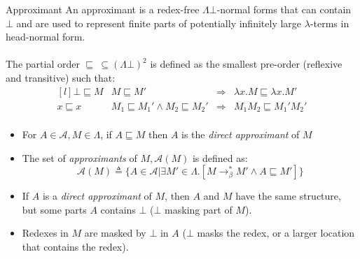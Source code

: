 \begin{definitionbox}{Approximant}
    An approximant is a redex-free $\Lambda\bot$-normal forms that can contain $\bot$ and are used to represent finite parts of potentially infinitely large $\lambda$-terms in head-normal form.
    \\
    \\ The partial order $\sqsubseteq \ \subseteq (\Lambda\bot)^2$ is defined as the smallest pre-order (reflexive and transitive) such that:
    \[\begin{matrix*}[l]
        \bot \sqsubseteq M & M \sqsubseteq M' & \Rightarrow & \lambda x. M \sqsubseteq \lambda x. M' \\
        x \sqsubseteq x & M_1 \sqsubseteq M_1' \land M_2 \sqsubseteq M_2' & \Rightarrow & M_1 M_2 \sqsubseteq M_1' M_2' \\
    \end{matrix*}\]
    \begin{itemize}
        \item For $A \in \mathcal{A}, M \in \Lambda$, if $A \sqsubseteq M$ then $A$ is the \textit{direct approximant} of $M$
        \item {The set of \textit{approximants} of $M, \mathcal{A}(M)$ is defined as:
            \[\mathcal{A}(M) \triangleq \{A \in \mathcal{A} | \exists M' \in \Lambda . [M \to^*_\beta M' \land A \sqsubseteq M']\}\]
        }
        \item If $A$ is a \textit{direct approximant} of $M$, then $A$ and $M$ have the same structure, but some parts $A$ contains $\bot$ ($\bot$ masking part of $M$). 
        \item Redexes in $M$ are masked by $\bot$ in $A$ ($\bot$ masks the redex, or a larger location that contains the redex).
    \end{itemize}
\end{definitionbox}


